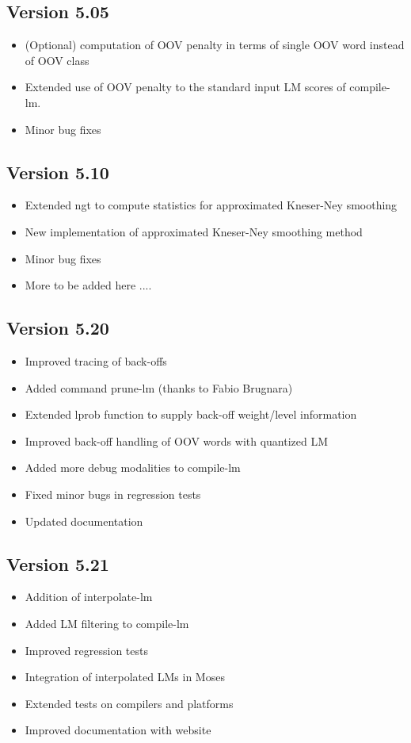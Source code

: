 \subsection{Version 5.05}
\begin{itemize}
\item (Optional) computation of OOV penalty in terms of single OOV word instead of OOV class
\item Extended use of OOV penalty to the standard input LM scores of compile-lm. 
\item Minor bug fixes
\end{itemize}

\subsection{Version 5.10}
\begin{itemize}
\item Extended ngt to compute statistics for approximated Kneser-Ney smoothing
\item New implementation of approximated Kneser-Ney smoothing method
\item Minor bug fixes
\item More to be added here ....
\end{itemize}

\subsection{Version 5.20}
\begin{itemize}
\item Improved tracing of back-offs
\item Added command prune-lm  (thanks to Fabio Brugnara)
\item Extended lprob function to supply back-off weight/level information
\item Improved back-off handling of OOV words with quantized LM
\item Added more debug modalities to compile-lm
\item Fixed minor bugs in regression tests
\item Updated documentation
\end{itemize}

\subsection{Version 5.21}
\begin{itemize}
\item Addition of interpolate-lm 
\item Added LM filtering to compile-lm
\item Improved regression tests
\item Integration of interpolated LMs in Moses
\item Extended tests on compilers and platforms
\item Improved documentation with website
\end{itemize}

